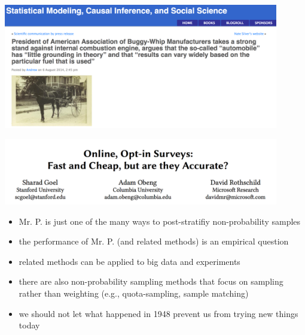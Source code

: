 \documentclass[aspectratio=169]{beamer}
\begin{document}
\begin{frame}

\begin{center}
\includegraphics[width=0.9\textwidth]{figures/gelman_buggywhip_blogpost}
\end{center}

\vfill
{}

\end{frame}
\begin{frame}

\begin{center}
\includegraphics[width=0.9\textwidth]{figures/goel_online_2017_title}
\end{center}

\end{frame}
\begin{frame}

\begin{itemize}
\item Mr. P. is just one of the many ways to post-stratifiy non-probability samples
\pause
\item the performance of Mr. P. (and related methods) is an empirical question
\pause
\item related methods can be applied to big data and experiments
\pause
\item there are also non-probability sampling methods that focus on sampling rather than weighting (e.g., quota-sampling, sample matching)
\pause
\item we should not let what happened in 1948 prevent us from trying new things today
\end{itemize}

\end{frame}
\end{document}
